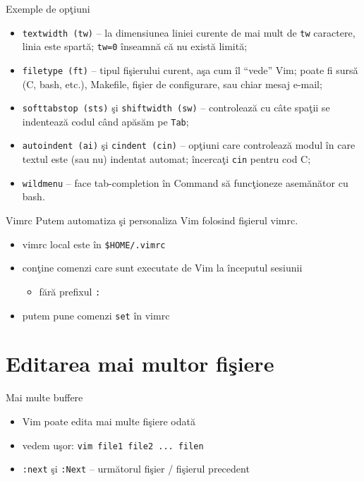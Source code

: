 \documentclass{beamer}
\begin{document}
\begin{frame}{Exemple de opţiuni}
\begin{itemize}
  \item<1-> \texttt{textwidth (tw)} -- la dimensiunea liniei curente de mai
  mult de \texttt{tw} caractere, linia este spartă; \texttt{tw=0} înseamnă că
  nu există limită;
  \item<2-> \texttt{filetype (ft)} -- tipul fişierului curent, aşa cum îl
  ``vede'' Vim; poate fi sursă (C, bash, etc.), Makefile, fişier de
  configurare, sau chiar mesaj e-mail;
  \item<3-> \texttt{softtabstop (sts)} şi \texttt{shiftwidth (sw)} --
  controlează cu câte spaţii se indentează codul când apăsăm pe \texttt{Tab};
  \item<4-> \texttt{autoindent (ai)} şi \texttt{cindent (cin)} -- opţiuni care
  controlează modul în care textul este (sau nu) indentat automat; încercaţi
  \texttt{cin} pentru cod C;
  \item<5-> \texttt{wildmenu} -- face tab-completion în Command să funcţioneze
  asemănător cu bash.
\end{itemize}
\end{frame}

\begin{frame}{Vimrc}
Putem automatiza şi personaliza Vim folosind fişierul vimrc.
\begin{itemize}
  \item<2-> vimrc local este în \texttt{\$HOME/.vimrc}
  \item<3-> conţine comenzi care sunt executate de Vim la începutul sesiunii
    \begin{itemize}
    \item<3-> fără prefixul \texttt{:}
    \end{itemize}
  \item<4-> putem pune comenzi \texttt{set} în vimrc
\end{itemize}
\end{frame}

\section{Editarea mai multor fişiere}
\frame{\tableofcontents[currentsection]}

\begin{frame}{Mai multe buffere}
\begin{itemize}
  \item<1-> Vim poate edita mai multe fişiere odată
  \item<2-> vedem uşor: \texttt{vim file1 file2 ... filen}
  \item<3-> \texttt{:next} şi \texttt{:Next} -- următorul fişier / fişierul
  precedent
\end{itemize}
\end{frame}
\end{document}
